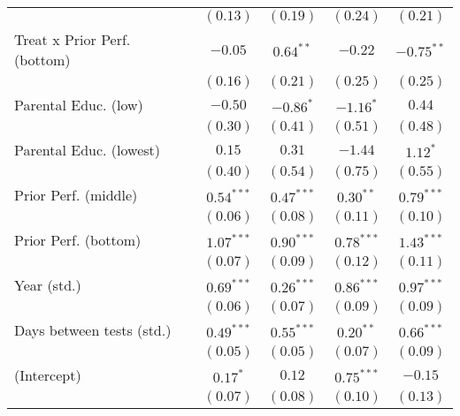 \begin{table}
\begin{center}
\begin{tabular}{l c c c c}
                                                   & $(0.13)$      & $(0.19)$      & $(0.24)$      & $(0.21)$      \\
Treat x Prior Perf. (bottom)                       & $-0.05$       & $0.64^{**}$   & $-0.22$       & $-0.75^{**}$  \\
                                                   & $(0.16)$      & $(0.21)$      & $(0.25)$      & $(0.25)$      \\
Parental Educ. (low)                               & $-0.50$       & $-0.86^{*}$   & $-1.16^{*}$   & $0.44$        \\
                                                   & $(0.30)$      & $(0.41)$      & $(0.51)$      & $(0.48)$      \\
Parental Educ. (lowest)                            & $0.15$        & $0.31$        & $-1.44$       & $1.12^{*}$    \\
                                                   & $(0.40)$      & $(0.54)$      & $(0.75)$      & $(0.55)$      \\
Prior Perf. (middle)                               & $0.54^{***}$  & $0.47^{***}$  & $0.30^{**}$   & $0.79^{***}$  \\
                                                   & $(0.06)$      & $(0.08)$      & $(0.11)$      & $(0.10)$      \\
Prior Perf. (bottom)                               & $1.07^{***}$  & $0.90^{***}$  & $0.78^{***}$  & $1.43^{***}$  \\
                                                   & $(0.07)$      & $(0.09)$      & $(0.12)$      & $(0.11)$      \\
Year (std.)                                        & $0.69^{***}$  & $0.26^{***}$  & $0.86^{***}$  & $0.97^{***}$  \\
                                                   & $(0.06)$      & $(0.07)$      & $(0.09)$      & $(0.09)$      \\
Days between tests (std.)                          & $0.49^{***}$  & $0.55^{***}$  & $0.20^{**}$   & $0.66^{***}$  \\
                                                   & $(0.05)$      & $(0.05)$      & $(0.07)$      & $(0.09)$      \\
(Intercept)                                        & $0.17^{*}$    & $0.12$        & $0.75^{***}$  & $-0.15$       \\
                                                   & $(0.07)$      & $(0.08)$      & $(0.10)$      & $(0.13)$      \\

\end{tabular}
\end{center}
\end{table}
